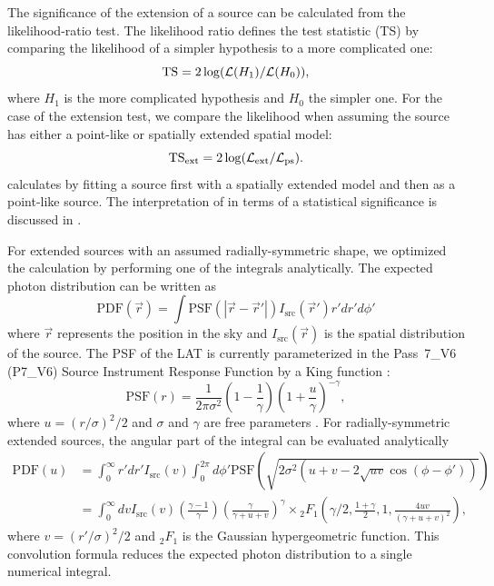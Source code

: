 The significance of the extension of a source can be calculated from the
likelihood-ratio test. The likelihood ratio defines the
test statistic (TS) by comparing the likelihood of a simpler hypothesis to
a more complicated one:
\begin{equation}
  \mathrm{TS}=2\log(\mathcal{L}(H_1)/\mathcal{L}(H_0)),
\end{equation}
where $H_1$ is the more complicated hypothesis and $H_0$ the simpler one.
For the case of the extension test, we compare the likelihood
when assuming the source has either a point-like or spatially extended spatial model:
\begin{equation}
  \mathrm{TS}_\mathrm{ext}=2\log(\mathcal{L}_\text{ext}/\mathcal{L}_\text{ps}).
\end{equation}
\pointlike calculates \tsext by fitting a source first with a spatially
extended model and then as a point-like source.  The interpretation
of \tsext in terms of a statistical significance is discussed in
.

For extended sources with an assumed radially-symmetric shape,
we optimized the calculation by performing one
of the integrals analytically.
The expected photon 
distribution can be written as
\begin{equation}
  \text{PDF}(\vec r) = \int  \text{PSF}(|\vec r - \vec r'|)I_\text{src}(\vec r') r' dr' d\phi'
\end{equation}
where $\vec r$ represents the position in the sky and
$I_\text{src}(\vec r)$ is the spatial distribution of the
source.
The PSF of the LAT is currently parameterized 
in the Pass~7\_V6 (P7\_V6) Source Instrument
Response Function \citep[IRFs,][]{ackermann_2012a_fermi-large} by a King function \citep{king_1962a_structure-clusters.}:
\begin{equation}
  \text{PSF}(r) = 
  \frac{1}{2\pi\sigma^2}
  \left(1-\frac{1}{\gamma}\right)
  \left(1+\frac{u}{\gamma}\right)^{-\gamma},
\end{equation}
where $u=(r/\sigma)^2/2$ and $\sigma$ and $\gamma$ are free parameters
\citep{kerr_2010a_likelihood-methods}.  For radially-symmetric extended sources,
the angular part of the integral can be evaluated analytically
\begin{align}
  \text{PDF}(u) & = \int_0^\infty r' dr'
  I_\text{src}(v) 
  \int_0^{2\pi} d\phi' 
  \text{PSF}(\sqrt{2\sigma^2(u+v-2\sqrt{uv}\cos(\phi-\phi'))})
  \\
  & = \int_0^\infty dv
  I_\text{src}(v) 
  \left(\frac{\gamma-1}{\gamma}\right)
  \left( \frac{\gamma}{\gamma + u + v}\right)^\gamma 
  \times {}_2F_1 \left(\gamma/2,\frac{1+\gamma}{2},1,\frac{4uv}{(\gamma+u+v)^2}\right),
\end{align}
where $v=(r'/\sigma)^2/2$ and ${}_2F_1$ is the Gaussian hypergeometric
function.  This convolution formula reduces the expected photon
distribution to a single numerical integral.

